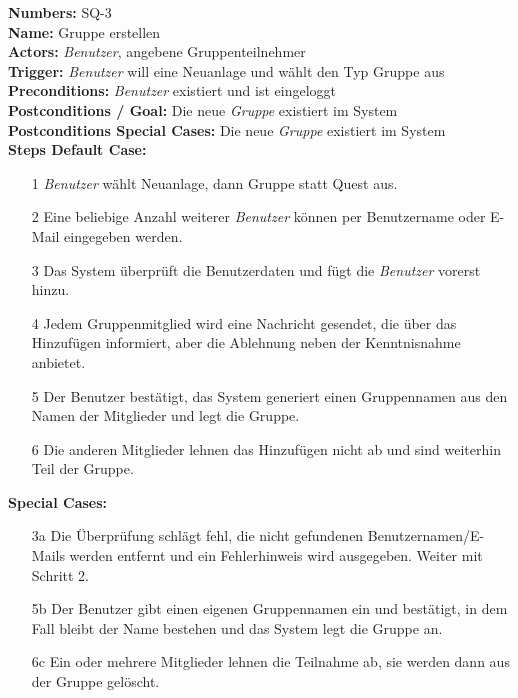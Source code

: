 \documentclass{article}
\begin{document}
\begin{samepage}
	\textbf{Numbers:} SQ-3 \\
	\textbf{Name:} Gruppe erstellen \\
	\textbf{Actors:} \textit{Benutzer}, angebene Gruppenteilnehmer \\
	\textbf{Trigger:} \textit{Benutzer} will eine Neuanlage und wählt den Typ Gruppe aus \\ 
	\textbf{Preconditions:} \textit{Benutzer} existiert und ist eingeloggt \\ 
	\textbf{Postconditions / Goal:} Die neue \textit{Gruppe} existiert im System \\
	\textbf{Postconditions Special Cases:} Die neue \textit{Gruppe} existiert im System \\
	\textbf{Steps Default Case:}
	\begin{itemize}
		\item[1] \textit{Benutzer} wählt Neuanlage, dann Gruppe statt Quest aus.
		\item[2] Eine beliebige Anzahl weiterer \textit{Benutzer} können per Benutzername oder E-Mail eingegeben werden.
		\item[3] Das System überprüft die Benutzerdaten und fügt die \textit{Benutzer} vorerst hinzu.
  		\item[4] Jedem Gruppenmitglied wird eine Nachricht gesendet, die über das Hinzufügen informiert, aber die Ablehnung neben der Kenntnisnahme anbietet.
    		\item[5] Der Benutzer bestätigt, das System generiert einen Gruppennamen aus den Namen der Mitglieder und legt die Gruppe.
      		\item[6] Die anderen Mitglieder lehnen das Hinzufügen nicht ab und sind weiterhin Teil der Gruppe.
	\end{itemize}
	\textbf{Special Cases:}
	\begin{itemize}
	\item [3a] Die Überprüfung schlägt fehl, die nicht gefundenen Benutzernamen/E-Mails werden entfernt und ein Fehlerhinweis wird ausgegeben. Weiter mit Schritt 2.
 	\item [5b] Der Benutzer gibt einen eigenen Gruppennamen ein und bestätigt, in dem Fall bleibt der Name bestehen und das System legt die Gruppe an.
  	\item [6c] Ein oder mehrere Mitglieder lehnen die Teilnahme ab, sie werden dann aus der Gruppe gelöscht.
	\end{itemize}
	\end{samepage}
\end{document}
